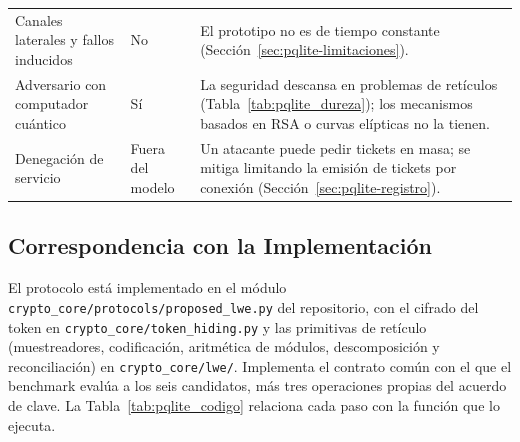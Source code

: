 \begin{table}[H]
\begin{tabularx}{\textwidth}{>{\raggedright\arraybackslash}p{4.1cm}>{\raggedright\arraybackslash}p{2.0cm}Y}
Canales laterales y fallos inducidos & No & El prototipo no es de tiempo constante (Sección~\ref{sec:pqlite-limitaciones}). \\
Adversario con computador cuántico & Sí & La seguridad descansa en problemas de retículos (Tabla~\ref{tab:pqlite_dureza}); los mecanismos basados en RSA o curvas elípticas no la tienen. \\
Denegación de servicio & Fuera del modelo & Un atacante puede pedir tickets en masa; se mitiga limitando la emisión de tickets por conexión (Sección~\ref{sec:pqlite-registro}). \\
\bottomrule
\end{tabularx}
\end{table}

\subsection{Correspondencia con la Implementación}
\label{sec:pqlite-implementacion}

El protocolo está implementado en el módulo \texttt{crypto\_core/protocols/proposed\_lwe.py} del repositorio, con el cifrado del token en \texttt{crypto\_core/token\_hiding.py} y las primitivas de retículo (muestreadores, codificación, aritmética de módulos, descomposición y reconciliación) en \texttt{crypto\_core/lwe/}. Implementa el contrato común con el que el benchmark evalúa a los seis candidatos, más tres operaciones propias del acuerdo de clave. La Tabla~\ref{tab:pqlite_codigo} relaciona cada paso con la función que lo ejecuta.

